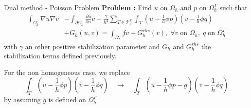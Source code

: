 \begin{frame}{Dual method -  Poisson Problem}
    \textbf{Problem :} Find $u$ on $\Omega_h$ and $p$ on $\Omega_h^\Gamma$ such that
    \begin{align*}
        \int_{\Omega_h}\nabla u\nabla v&-\int_{\partial\Omega_h}\frac{\partial u}{\partial n} v + \frac{\gamma}{h^2} \sum_{T\in\mathcal{T}_h^\Gamma}\int_T \left(u-\frac{1}{h}\phi p\right)\left(v-\frac{1}{h}\phi q\right) \\
        &+ G_h(u,v) = \int_{\Omega_h}fv + G_h^{rhs}(v), \; \forall v \; \text{on } \Omega_h, \; q \; \text{on } \Omega_h^\Gamma
    \end{align*}
    with $\gamma$ an other positive stabilization parameter and $G_h$ and $G_h^{rhs}$ the stabilization terms defined previously.
    
    For the non homogeneous case, we replace
    $$\int_T \left(u-\frac{1}{h}\phi p\right)\left(v-\frac{1}{h}\phi q\right) \quad \rightarrow \quad \int_T\left(u-\frac{1}{h}\phi p-g\right)\left(v-\frac{1}{h}\phi q\right)$$ 
    by assuming $g$ is defined on $\Omega_h^\Gamma$
\end{frame}